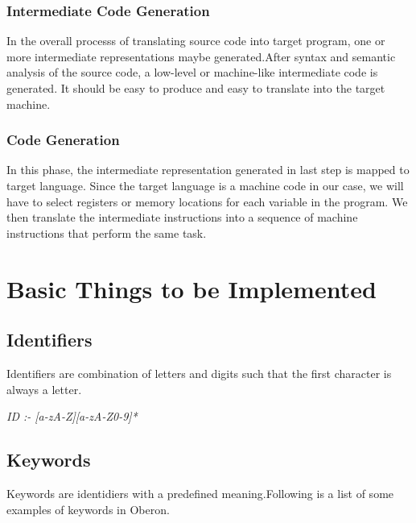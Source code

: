 \documentclass{article}
\begin{document}
\subsubsection{Intermediate Code Generation}
In the overall processs of translating source code into target program, one or more intermediate representations maybe generated.After syntax and semantic analysis of the source code, a low-level or machine-like intermediate code is generated. It should be easy to produce and easy to translate into the target machine.
\subsubsection{Code Generation}
In this phase, the intermediate representation generated in last step is mapped to target language. Since the target language is a machine code in our case, we will have to select registers or memory locations for each variable in the program. We then translate the intermediate instructions into a sequence of machine instructions that perform the same task.

\section{Basic Things to be Implemented}
\subsection {Identifiers}
Identifiers are combination of letters and digits such that the first character is always a letter.
\begin{center}{\it ID  :- [a-­zA-Z][a-­zA-Z0-­9]* }\end{center}
\subsection { Keywords }
Keywords are identidiers with a predefined meaning.Following is a list of some examples of keywords in Oberon.
\end{document}
